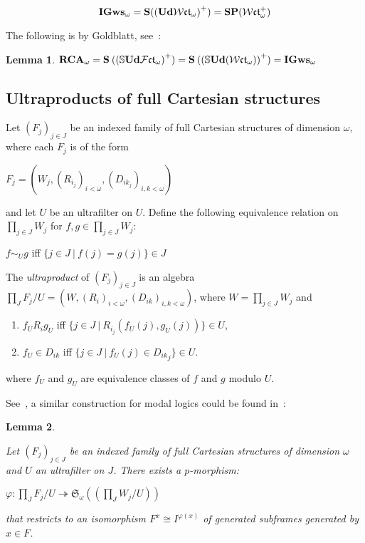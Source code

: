 \documentclass{article}
\theoremstyle{defin}
\theoremstyle{theorem}
\theoremstyle{claim}
\theoremstyle{prop}
\theoremstyle{lemma}
\newtheorem{lemma}{Lemma}
\theoremstyle{fact}
\theoremstyle{remark}
\theoremstyle{ex}
\theoremstyle{col}
\theoremstyle{question}
\begin{document}
\begin{equation}
{\bf IGws}_{\omega} = {\bf S} ({({\bf Ud} \mathcal{W}\mathfrak{ct}_{\omega})}^+) = {\bf S P} (\mathcal{W}\mathfrak{ct}_{\omega}^{+})
\end{equation}

The following is by Goldblatt, see~\cite[Lemma 3.4]{goldblatt1995elementary}:
\begin{lemma}
${\bf RCA}_{\omega} = {\bf S} \: ({(\mathbb{S} {\bf Ud} \mathcal{F}\mathfrak{ct}_{\omega})}^{+}) = {\bf S} \: ({(\mathbb{S} {\bf Ud} (\mathcal{W}\mathfrak{ct}_{\omega}))}^{+}) = {\bf IGws}_{\omega}$
\end{lemma}

\subsection{Ultraproducts of full Cartesian structures}

Let ${(F_j)}_{j \in J}$ be an indexed family of full Cartesian structures of dimension $\omega$, 
where each $F_j$ is of the form 
\begin{center}
$F_j = (W_j, {(R_{i_j})}_{i < \omega}, {(D_{{ik}_j})}_{i, k < \omega})$
\end{center}
and let $U$ be an ultrafilter on $U$. 
Define the following equivalence relation on 
$\prod \limits_{j \in J} W_j$ for $f, g \in \prod \limits_{j \in J} W_j$:
\begin{center}
$f \sim_{U} g$ iff $\{ j \in J \: | \: f(j) = g(j) \} \in J$
\end{center}
The \emph{ultraproduct} of ${(F_j)}_{j \in J}$ is an algebra 
$\prod \limits_{J} F_j / U = (W, {(R_i)}_{i < \omega}, {(D_{ik})}_{i, k < \omega})$, 
where $W = \prod \limits_{j \in J} W_j$ and
\begin{enumerate}
\item $f_U R_i g_U$ iff $\{ j \in J \: | \: R_{i_j}(f_U(j), g_U(j)) \} \in U$,
\item $f_U \in D_{ik}$ iff $\{ j \in J \: | \: f_U(j) \in {D_{ik}}_j \} \in U$.
\end{enumerate}
where $f_U$ and $g_U$ are equivalence classes of $f$ and $g$ modulo $U$.

See~\cite[Lemma 3.5]{goldblatt1995elementary}, 
a similar construction for modal logics could be found in~\cite{fine1975some}:
\begin{lemma}~\label{ultrapmor}

Let ${(F_j)}_{j \in J}$ be an indexed family of full Cartesian structures of dimension 
$\omega$ and $U$ an ultrafilter on $J$. There exists a $p$-morphism:

\begin{center}
$\varphi : \prod \limits_{J} F_j / U \twoheadrightarrow \mathfrak{S}_{\omega}((\prod \limits_{J} W_j / U))$
\end{center}
that restricts to an isomorphism $F^x \cong I^{\varphi(x)}$ of generated subframes generated by $x \in F$.
\end{lemma}
\end{document}
